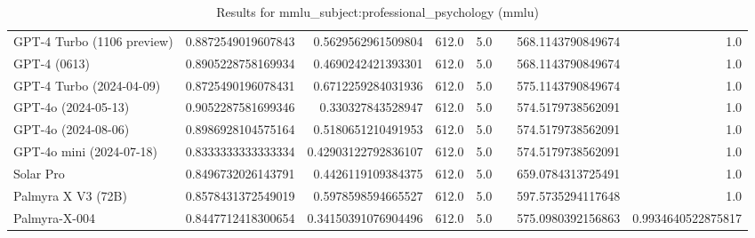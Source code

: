 \begin{table}[htp]
{\begin{tabular}{lrrrrrrr}
GPT-4 Turbo (1106 preview) & 0.8872549019607843 & 0.5629562961509804 & 612.0 & 5.0 &  & 568.1143790849674 & 1.0 \\
GPT-4 (0613) & 0.8905228758169934 & 0.4690242421393301 & 612.0 & 5.0 &  & 568.1143790849674 & 1.0 \\
GPT-4 Turbo (2024-04-09) & 0.8725490196078431 & 0.6712259284031936 & 612.0 & 5.0 &  & 575.1143790849674 & 1.0 \\
GPT-4o (2024-05-13) & 0.9052287581699346 & 0.330327843528947 & 612.0 & 5.0 &  & 574.5179738562091 & 1.0 \\
GPT-4o (2024-08-06) & 0.8986928104575164 & 0.5180651210491953 & 612.0 & 5.0 &  & 574.5179738562091 & 1.0 \\
GPT-4o mini (2024-07-18) & 0.8333333333333334 & 0.42903122792836107 & 612.0 & 5.0 &  & 574.5179738562091 & 1.0 \\
Solar Pro & 0.8496732026143791 & 0.4426119109384375 & 612.0 & 5.0 &  & 659.0784313725491 & 1.0 \\
Palmyra X V3 (72B) & 0.8578431372549019 & 0.5978598594665527 & 612.0 & 5.0 &  & 597.5735294117648 & 1.0 \\
Palmyra-X-004 & 0.8447712418300654 & 0.34150391076904496 & 612.0 & 5.0 &  & 575.0980392156863 & 0.9934640522875817 \\
\bottomrule
\end{tabular}}
\caption{Results for mmlu_subject:professional_psychology (mmlu)}
\label{fig:mmlu_subject:professional_psychology (mmlu)}
\end{table}